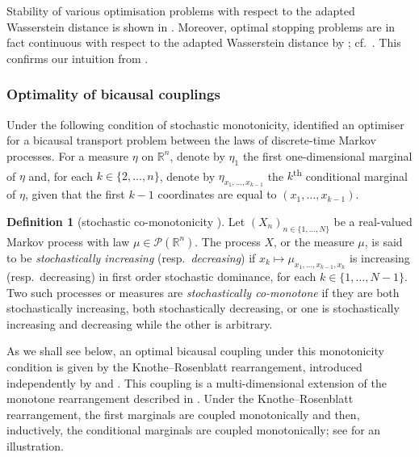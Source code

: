 \documentclass[onseside, final]{amsart}
\theoremstyle{definition}
\newtheorem{definition}[theorem]{Definition}
\newcommand{\Pc}{\mathcal P}
\newcommand{\R}{\mathbb R}
\numberwithin{equation}{section}
\begin{document}
			Stability of various optimisation problems with respect to the adapted Wasserstein distance is shown in \citet{BaBaBeEd19a}. Moreover, optimal stopping problems are in fact continuous with respect to the adapted Wasserstein distance by \citep[Lemma 7.1]{BaBaBeEd19b}; cf.~\citep[Theorem 17.2]{Al81}. This confirms our intuition from .
		
		\subsubsection{Optimality of bicausal couplings}
		
			Under the following condition of stochastic monotonicity, \citet{Ru85} identified an optimiser for a bicausal transport problem between the laws of discrete-time Markov processes. For a measure $\eta$ on $\R^n$, denote by $\eta_1$ the first one-dimensional marginal of $\eta$ and, for each $k \in \{2, \dotsc, n\}$, denote by $\eta_{x_1, \dotsc, x_{k-1}}$ the $k$\textsuperscript{th} conditional marginal of $\eta$, given that the first $k-1$ coordinates are equal to $(x_1, \dotsc, x_{k -1})$.
			
			\begin{definition}[stochastic co-monotonicity \citep{Da68}]\label{def:stoch-dom}
				Let $(X_n)_{n \in \{1, \dotsc, N\}}$ be a real-valued Markov process with law $\mu \in \Pc(\R^n)$. The process $X$, or the measure $\mu$, is said to be \emph{stochastically increasing} (resp.\ \emph{decreasing}) if $x_k \mapsto \mu_{x_1, \dotsc, x_{k - 1}, x_k}$ is increasing (resp.\ decreasing) in first order stochastic dominance, for each $k \in \{1, \dotsc, N - 1\}$.
				Two such processes or measures are \emph{stochastically co-monotone} if they are both stochastically increasing, both stochastically decreasing, or one is stochastically increasing and decreasing while the other is arbitrary.
			\end{definition}
			
			As we shall see below, an optimal bicausal coupling under this monotonicity condition is given by the Knothe--Rosenblatt rearrangement, introduced independently by \citet{Ro52} and \citet{Kn57}. This coupling is a multi-dimensional extension of the monotone rearrangement described in . Under the Knothe--Rosenblatt rearrangement, the first marginals are coupled monotonically and then, inductively, the conditional marginals are coupled monotonically; see \citep[Figure 1]{BaKaRo22} for an illustration.
			
\end{document}
